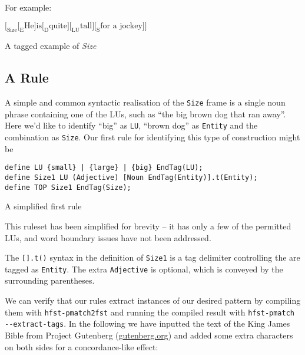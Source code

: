 \documentclass{llncs}
\begin{document}
For example:

\begin{table}[h]
\begin{center}
\begin{math}
\Big[_{\text{Size}}\Big[_{\text{E}}\text{He} \Big]
  \text{is} \Big[_{\text{D}} \text{quite} \Big] \Big[_{\text{LU}}\text{tall} \Big]
  \Big[_{\text{S}} \text{for a jockey} \Big] \Big]
\end{math}
\end{center}
\caption{A tagged example of \emph{Size}}
\end{table}

\subsection{A Rule}

A simple and common syntactic realisation of the \verb+Size+ frame is a single
noun phrase containing one of the LUs, such as
``the big brown dog that ran away''. Here we'd like to identify ``big'' as \verb+LU+,
``brown dog'' as \verb+Entity+ and the combination as \verb+Size+.
Our first rule for identifying this type of construction might be

\begin{table}[h]
  \small
  \begin{framed}
\begin{verbatim}
define LU {small} | {large} | {big} EndTag(LU);
define Size1 LU (Adjective) [Noun EndTag(Entity)].t(Entity);
define TOP Size1 EndTag(Size);  
\end{verbatim}
\end{framed}
\normalsize
\caption{A simplified first rule}
\end{table}

This ruleset has been simplified for brevity -- it has only a few of the
permitted LUs, and word boundary issues have not been addressed.

The \verb+[].t()+ syntax in the definition of \verb+Size1+ is a tag delimiter
controlling the are tagged as \verb+Entity+. The extra \verb+Adjective+ is
optional, which is conveyed by the surrounding parentheses.

We can verify that our rules extract instances of our desired pattern by compiling
them with \verb+hfst-pmatch2fst+ and running the compiled result with
\verb+hfst-pmatch --extract-tags+. In the following we have
inputted the text of the King James Bible from Project
Gutenberg (\url{gutenberg.org}) and added some extra characters on both
sides for
a concordance-like effect:
\end{document}
